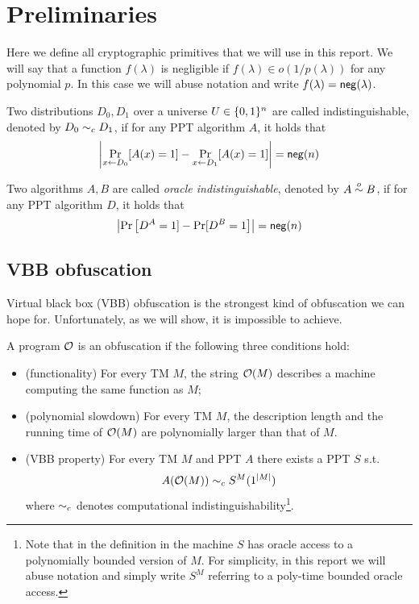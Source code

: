 \section{Preliminaries}
\label{sec:prel}
Here we define all cryptographic primitives that we will use in this report. We will say that a function $f(\lambda)$ is negligible if $f(\lambda)\in o(1/p(\lambda))$ for any polynomial $p$. In this case we will abuse notation and write $f(\lambda)=\mathsf{neg}(\lambda)$.

Two distributions $D_0,D_1$ over a universe $U\in\{0,1\}^n$ are called indistinguishable, denoted by $D_0\sim_c D_1$, if for any PPT algorithm $A$, it holds that
\[
\left|\Pr_{x\gets D_0}[A(x)=1]-\Pr_{x\gets D_1}[A(x)=1]\right|=\mathsf{neg}(n)
\]

Two algorithms $A,B$ are called \emph{oracle indistinguishable}, denoted by $A\overset{o}{\sim} B$, if for any PPT algorithm $D$, it holds that
\[
\left|\Pr\left[D^A=1]-\Pr[D^B=1\right]\right|=\mathsf{neg}(n)
\]

\subsection{VBB obfuscation}
Virtual black box (VBB) obfuscation is the strongest kind of obfuscation we can hope for. Unfortunately, as we will show, it is impossible to achieve.

\begin{mydef}[TM-obfuscator]
	\label{def:VBB-tm}
	A program $\mathcal{O}$ is an obfuscation if the following three conditions hold: %
	\begin{itemize}
		\item (functionality) For every TM $M$, the string $\mathcal{O}(M)$ describes a machine computing the same function as $M$;
		\item (polynomial slowdown)  For every TM $M$, the description length and the running time of $\mathcal{O}(M)$ are polynomially larger than that of $M$.
		\item (VBB property) For every TM $M$ and PPT $A$ there exists a PPT $S$ s.t. 
		$$ A(\mathcal{O}(M)) \sim_c S^M(1^{|M|}) $$
		where $\sim_c$ denotes computational indistinguishability\footnote{Note that in the definition in \cite{VBB-imp} the machine $S$ has oracle access to a polynomially bounded version of $M$. For simplicity, in this report we will abuse notation and simply write $S^M$ referring to a poly-time bounded oracle access. }.
	\end{itemize}
\end{mydef}

